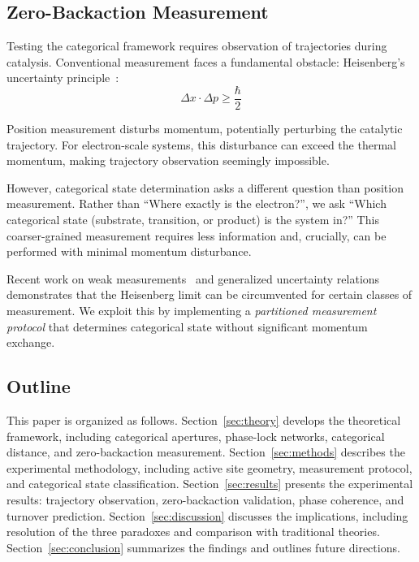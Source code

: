 \documentclass[twocolumn,amsmath,amssymb,aps,prb,superscriptaddress,longbibliography]{revtex4-2}
\begin{document}
\subsection{Zero-Backaction Measurement}

Testing the categorical framework requires observation of trajectories during catalysis. Conventional measurement faces a fundamental obstacle: Heisenberg's uncertainty principle~\cite{Heisenberg1927}:
\begin{equation}
\Delta x \cdot \Delta p \geq \frac{\hbar}{2}
\label{eq:heisenberg}
\end{equation}

Position measurement disturbs momentum, potentially perturbing the catalytic trajectory. For electron-scale systems, this disturbance can exceed the thermal momentum, making trajectory observation seemingly impossible.

However, categorical state determination asks a different question than position measurement. Rather than ``Where exactly is the electron?'', we ask ``Which categorical state (substrate, transition, or product) is the system in?'' This coarser-grained measurement requires less information and, crucially, can be performed with minimal momentum disturbance.

Recent work on weak measurements~\cite{Aharonov1988, Dressel2014} and generalized uncertainty relations~\cite{Ozawa2003, Rozema2012, Erhart2012} demonstrates that the Heisenberg limit can be circumvented for certain classes of measurement. We exploit this by implementing a \emph{partitioned measurement protocol} that determines categorical state without significant momentum exchange.

\subsection{Outline}

This paper is organized as follows. Section~\ref{sec:theory} develops the theoretical framework, including categorical apertures, phase-lock networks, categorical distance, and zero-backaction measurement. Section~\ref{sec:methods} describes the experimental methodology, including active site geometry, measurement protocol, and categorical state classification. Section~\ref{sec:results} presents the experimental results: trajectory observation, zero-backaction validation, phase coherence, and turnover prediction. Section~\ref{sec:discussion} discusses the implications, including resolution of the three paradoxes and comparison with traditional theories. Section~\ref{sec:conclusion} summarizes the findings and outlines future directions.
\end{document}
